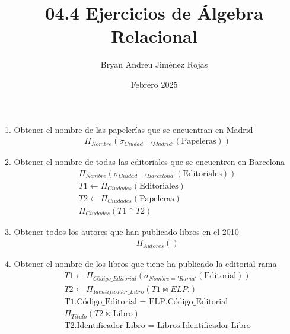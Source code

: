\documentclass{article}
\title{04.4 Ejercicios de Álgebra Relacional}
\author{Bryan Andreu Jiménez Rojas}
\date{Febrero 2025}
\begin{document}
\maketitle

\textnormal{1. Obtener el nombre de las papelerías que se encuentran en Madrid}
\begin{equation*}
	\begin{flalign*}
		& \Pi_{Nombre} \left(\sigma_{Ciudad = 'Madrid'} \left(\text{Papeleras}\right)\right)
	\end{flalign*}
\end{equation*}

\textnormal{2. Obtener el nombre de todas las editoriales que se encuentren en Barcelona}
\begin{equation*}
	\begin{flalign*}
		& \Pi_{Nombre} \left(\sigma_{Ciudad = 'Barcelona'} \left(\text{Editoriales}\right)\right) \\
		& T1 \leftarrow \Pi_{Ciudades} \left(\text{Editoriales}\right) \\
		& T2 \leftarrow \Pi_{Ciudades} \left(\text{Papeleras}\right) \\
		& \Pi_{Ciudades} \left(T1 \cap T2\right)
	\end{flalign*}
\end{equation*}

\textnormal{3. Obtener todos los autores que han publicado libros en el 2010}
\begin{equation*}
	\begin{flalign*}
		& \Pi_{Autores} \left(\right) %
	\end{flalign*}
\end{equation*}

\textnormal{4. Obtener el nombre de los libros que tiene ha publicado la editorial rama}
\begin{equation*}
	\begin{flalign*}
		& T1 \leftarrow \Pi_{Código\_Editorial} \left(\sigma_{Nombre = 'Rama'} \left(\text{Editorial}\right)\right) \\
		& T2 \leftarrow \Pi_{Identificador\_Libro} \left(T1 \bowtie ELP.\right) \\
		& \text{T1.Código\_Editorial = ELP.Código\_Editorial} \\
		& \Pi_{Titulo} \left(T2 \bowtie \text{Libro}\right) \\
		& \text{T2.Identificador\_Libro = Libros.Identificador\_Libro}
	\end{flalign*}
\end{equation*}
\end{document}
